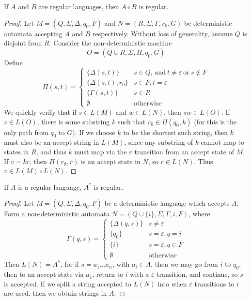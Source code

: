 \begin{theorem}
    If $A$ and $B$ are regular languages, then $A \circ B$ is regular.
\end{theorem}
\begin{proof}
    Let $M = (Q, \Sigma, \Delta, q_0, F)$ and $N = (R, \Sigma, \Gamma, r_0, G)$ be deterministic automata accepting $A$ and $B$ respectively. Without loss of generality, assume $Q$ is disjoint from $R$. Consider the non-deterministic machine
    \[ O = (Q \cup R, \Sigma, \Pi, q_0, G) \]
    Define
    \[ \Pi(s,t) = \begin{cases} \{ \Delta(s,t) \} & s \in Q\text{, and}\ t \neq \varepsilon\ \text{or}\ s \not \in F \\ \{ \Delta(s,t), r_0 \} & s \in F, t = \varepsilon\\ \{ \Gamma(s,t) \} & s \in R\\
    \emptyset & \text{otherwise} \end{cases} \]
    We quickly verify that if $s \in L(M)$ and $w \in L(N)$, then $sw \in L(O)$. If $v \in L(O)$, there is some substring $k$ such that $r_0 \in \Pi(q_0, k)$ (for this is the only path from $q_0$ to $G$). If we choose $k$ to be the shortest such string, then $k$ must also be an accept string in $L(M)$, since any substring of $k$ cannot map to states in $R$, and thus $k$ must map via the $\varepsilon$ transition from an accept state of $M$. If $v = kr$, then $\Pi(r_0, r)$ is an accept state in $N$, so $r \in L(N)$. Thus $v \in L(M) \circ L(N)$.
\end{proof}

\begin{theorem}
    If $A$ is a regular language, $A^*$ is regular.
\end{theorem}
\begin{proof}
    Let $M = (Q, \Sigma, \Delta, q_0, F)$ be a deterministic language which accepts $A$. Form a non-deterministic automata $N = (Q \cup \{ i \}, \Sigma, \Gamma, i, F)$, where
    \[ \Gamma(q,s) = \begin{cases} \{ \Delta(q,s) \} & s \neq \varepsilon \\ \{ q_0 \} & s = \varepsilon, q = i \\ \{ i \} & s = \varepsilon, q \in F \\ \emptyset & \text{otherwise} \end{cases} \]
    Then $L(N) = A^*$, for if $s = a_1 \dots a_n$, with $a_i \in A$, then we may go from $i$ to $q_0$, then to an accept state via $a_1$, return to $i$ with a $\varepsilon$ transition, and continue, so $s$ is accepted. If we split a string accepted to $L(N)$ into when $\varepsilon$ transitions to $i$ are used, then we obtain strings in $A$.
\end{proof}

